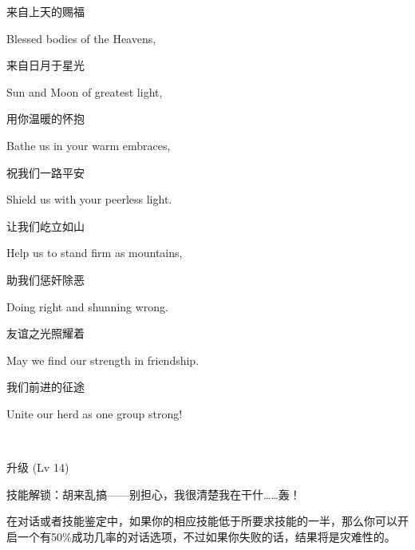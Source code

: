 \begin{song}
    来自上天的赐福
    
    Blessed bodies of the Heavens,
    
    \medskip

    来自日月于星光
    
    Sun and Moon of greatest light,
    
    \medskip

    用你温暖的怀抱
    
    Bathe us in your warm embraces,
    
    \medskip

    祝我们一路平安
    
    Shield us with your peerless light.
    
    \medskip

    让我们屹立如山
    
    Help us to stand firm as mountains,
    
    \medskip

    助我们惩奸除恶
    
    Doing right and shunning wrong.
    
    \medskip

    友谊之光照耀着
    
    May we find our strength in friendship.
    
    \medskip

    我们前进的征途
    
    Unite our herd as one group strong!
\end{song}


~\vfill

\begin{note}
    升级 (Lv 14) 

    技能解锁：胡来乱搞——别担心，我很清楚我在干什……轰！   

    在对话或者技能鉴定中，如果你的相应技能低于所要求技能的一半，那么你可以开启一个有50\%成功几率的对话选项，不过如果你失败的话，结果将是灾难性的。
\end{note}





